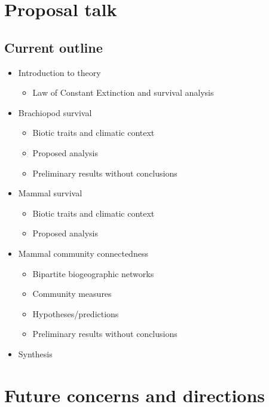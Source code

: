 \documentclass[12pt,letterpaper]{article}
\begin{document}
\section{Proposal talk}
\subsection{Current outline}
\begin{itemize}
  \item Introduction to theory
    \begin{itemize}
      \item Law of Constant Extinction and survival analysis
    \end{itemize}
  \item Brachiopod survival
    \begin{itemize}
      \item Biotic traits and climatic context
      \item Proposed analysis
      \item Preliminary results without conclusions
    \end{itemize}
  \item Mammal survival
    \begin{itemize}
      \item Biotic traits and climatic context
      \item Proposed analysis
    \end{itemize}
  \item Mammal community connectedness
    \begin{itemize}
      \item Bipartite biogeographic networks
      \item Community measures
      \item Hypotheses/predictions
      \item Preliminary results without conclusions
    \end{itemize}
  \item Synthesis
\end{itemize}


\section{Future concerns and directions}
\end{document}
